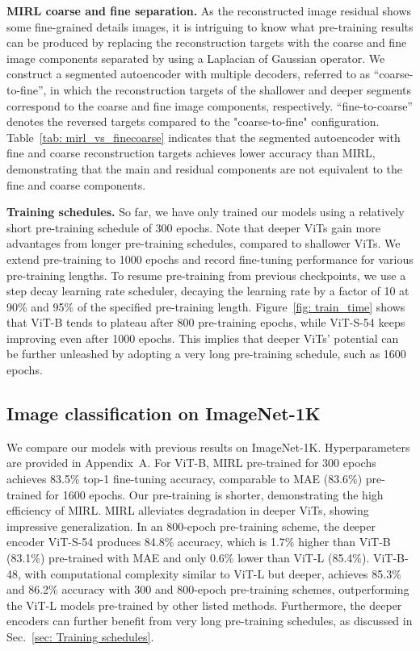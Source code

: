 \documentclass{article}
\begin{document}
\textbf{MIRL \vs coarse and fine separation.}
As the reconstructed image residual shows some fine-grained details images, it is intriguing to know what pre-training results can be produced by replacing the reconstruction targets with the coarse and fine image components separated by using a Laplacian of Gaussian operator.
We construct a segmented autoencoder with multiple decoders, referred to as ``coarse-to-fine'', in which the reconstruction targets of the shallower and deeper segments correspond to the coarse and fine image components, respectively. ``fine-to-coarse'' denotes the reversed targets compared to the "coarse-to-fine" configuration.
Table~\ref{tab: mirl_vs_finecoarse} indicates that the segmented autoencoder with fine and coarse reconstruction targets achieves lower accuracy than MIRL, demonstrating that the main and residual components are not equivalent to the fine and coarse components.

\textbf{Training schedules.} 
\label{sec: Training schedules}
So far, we have only trained our models using a relatively short pre-training schedule of 300 epochs. 
Note that deeper ViTs gain more advantages from longer pre-training schedules, compared to shallower ViTs. We extend pre-training to 1000 epochs and record fine-tuning performance for various pre-training lengths. To resume pre-training from previous checkpoints, we use a step decay learning rate scheduler, decaying the learning rate by a factor of 10 at 90\% and 95\% of the specified pre-training length.
Figure~\ref{fig: train_time} shows that ViT-B tends to plateau after 800 pre-training epochs, while ViT-S-54 keeps improving even after 1000 epochs. This implies that deeper ViTs' potential can be further unleashed by adopting a very long pre-training schedule, such as 1600 epochs.

\vspace{5pt}
\subsection{Image classification on ImageNet-1K}

We compare our models with previous results on ImageNet-1K. Hyperparameters are provided in Appendix~A.
For ViT-B, MIRL pre-trained for 300 epochs achieves 83.5\% top-1 fine-tuning accuracy, comparable to MAE (83.6\%) pre-trained for 1600 epochs. Our pre-training is  shorter, demonstrating the high efficiency of MIRL. MIRL alleviates degradation in deeper ViTs, showing impressive generalization.
In an 800-epoch pre-training scheme, the deeper encoder ViT-S-54 produces 84.8\% accuracy, which is 1.7\% higher than ViT-B (83.1\%) pre-trained with MAE and only 0.6\% lower than ViT-L (85.4\%).
ViT-B-48, with computational complexity similar to ViT-L but  deeper, achieves 85.3\% and 86.2\% accuracy with 300 and 800-epoch pre-training schemes, outperforming the ViT-L models pre-trained by other listed methods.
Furthermore, the deeper encoders can further benefit from very long pre-training schedules, as discussed in Sec.~\ref{sec: Training schedules}.
\end{document}
